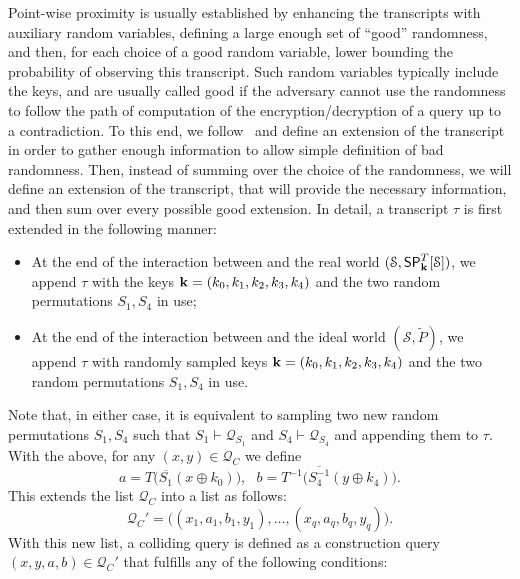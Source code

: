 \documentclass[journal=tosc,final,nohyperref]{iacrtrans}
\begin{document}
Point-wise proximity is usually established by enhancing the transcripts with auxiliary random variables, defining a large enough set of ``good'' randomness, and then, for each choice of a good random variable, lower bounding the probability of observing this transcript. Such random variables typically include the keys, and are usually called good if the adversary cannot use the randomness to follow the path of computation of the encryption/decryption of a query up to a contradiction. To this end, we follow~\cite[Sect. 4.2]{C:CDKLST18} and define an extension of the transcript in order to gather enough information to allow simple definition of bad randomness. Then, instead of summing over the choice of the randomness, we will define an extension of the transcript, that will provide the necessary information, and then sum over every possible good extension. In detail, a transcript $\tau$ is first extended in the following manner:
\begin{itemize}
	\item At the end of the interaction between \dis and the real world $(\mathcal{S},\mathsf{SP}_{\mathbf{k}}^T[\mathcal{S}])$, we append $\tau$ with the keys $\mathbf{k}=(k_0,k_1,k_2,k_3,k_4)$ and the two random permutations $S_1,S_4$ in use;
	\item At the end of the interaction between \dis and the ideal world $(\mathcal{S},\widetilde{P})$, we append $\tau$ with randomly sampled keys $\mathbf{k}=(k_0,k_1,k_2,k_3,k_4)$ and the two random permutations $S_1,S_4$ in use.
\end{itemize}
Note that, in either case, it is equivalent to sampling two new random permutations $S_1,S_4$ such that $S_1\vdash\mathcal{Q}_{S_{1}}$ and $S_4\vdash\mathcal{Q}_{S_4}$ and appending them to $\tau$. With the above, for any $(x,y)\in\mathcal{Q}_C$ we define
%
$$a=T\big(\overline{S_1}\left(x \oplus k_{0}\right)\big),\ \ \  b=T^{-1}\big(\overline{S_{4}^{-1}}\left(y \oplus k_{4}\right)\big).$$
%
This extends the list $\mathcal{Q}_C$ into a list as follows:
%
$$\mathcal{Q}_C'=\big((x_1,a_1,b_1,y_1),\ldots,(x_q,a_q,b_q,y_q)\big).$$
%
With this new list, a colliding query is defined as a construction query $(x,y,a,b)\in\mathcal{Q}_C'$ that fulfills any of the following conditions:
%
\end{document}
